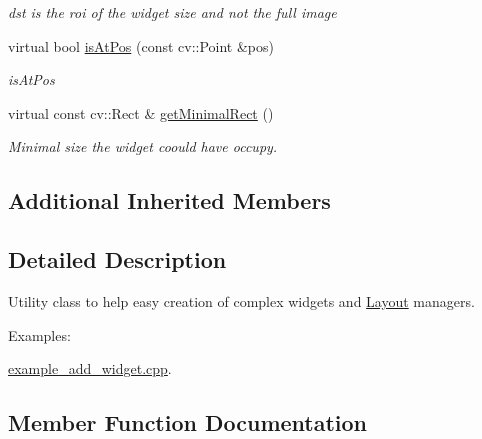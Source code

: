 \begin{DoxyCompactItemize}
\begin{DoxyCompactList}\small\item\em dst is the roi of the widget size and not the full image \end{DoxyCompactList}\item 
virtual bool \hyperlink{classcanvascv_1_1CompoundWidget_a00a67f3864155e74c60df66bc78c940e}{is\+At\+Pos} (const cv\+::\+Point \&pos)
\begin{DoxyCompactList}\small\item\em is\+At\+Pos \end{DoxyCompactList}\item 
virtual const cv\+::\+Rect \& \hyperlink{classcanvascv_1_1CompoundWidget_aa28f3ee799cc30222f0f272ea070ee30}{get\+Minimal\+Rect} ()\hypertarget{classcanvascv_1_1CompoundWidget_aa28f3ee799cc30222f0f272ea070ee30}{}\label{classcanvascv_1_1CompoundWidget_aa28f3ee799cc30222f0f272ea070ee30}

\begin{DoxyCompactList}\small\item\em Minimal size the widget coould have occupy. \end{DoxyCompactList}\end{DoxyCompactItemize}
\subsection*{Additional Inherited Members}


\subsection{Detailed Description}
Utility class to help easy creation of complex widgets and \hyperlink{classcanvascv_1_1Layout}{Layout} managers. \begin{Desc}
\item[Examples\+: ]\par
\hyperlink{example_add_widget_8cpp-example}{example\+\_\+add\+\_\+widget.\+cpp}.\end{Desc}


\subsection{Member Function Documentation}
